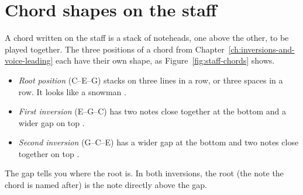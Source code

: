 \section{Chord shapes on the staff}

A chord written on the staff is a stack of noteheads, one above the other, to be played together. The three positions of a chord from Chapter~\ref{ch:inversions-and-voice-leading} each have their own shape, as Figure~\ref{fig:staff-chords} shows.
\begin{itemize}
  \item \emph{Root position} (C--E--G) stacks on three lines in a row, or three spaces in a row. It looks like a snowman .
  \item \emph{First inversion} (E--G--C) has two notes close together at the bottom and a wider gap on top .
  \item \emph{Second inversion} (G--C--E) has a wider gap at the bottom and two notes close together on top .
\end{itemize}

The gap tells you where the root is. In both inversions, the root (the note the chord is named after) is the note directly above the gap.

